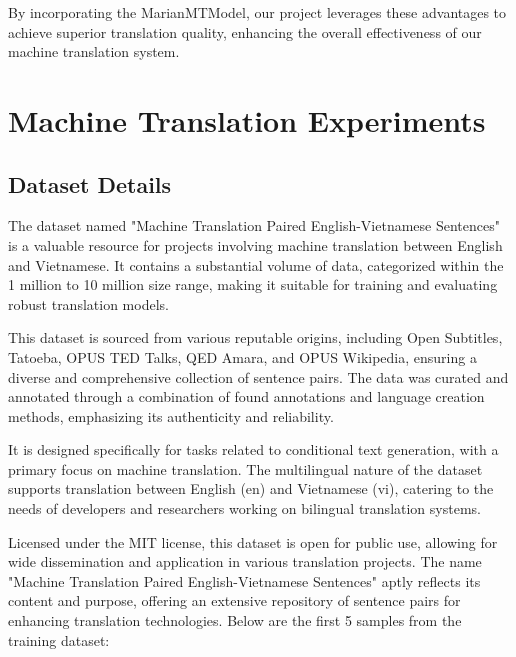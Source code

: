 \documentclass{article}
\begin{document}
By incorporating the MarianMTModel, our project leverages these advantages to achieve superior translation quality, enhancing the overall effectiveness of our machine translation system.

\section{Machine Translation Experiments}

\subsection{Dataset Details}
The dataset named "Machine Translation Paired English-Vietnamese Sentences" is a valuable resource for projects involving machine translation between English and Vietnamese. It contains a substantial volume of data, categorized within the 1 million to 10 million size range, making it suitable for training and evaluating robust translation models.

This dataset is sourced from various reputable origins, including Open Subtitles, Tatoeba, OPUS TED Talks, QED Amara, and OPUS Wikipedia, ensuring a diverse and comprehensive collection of sentence pairs. The data was curated and annotated through a combination of found annotations and language creation methods, emphasizing its authenticity and reliability.

It is designed specifically for tasks related to conditional text generation, with a primary focus on machine translation. The multilingual nature of the dataset supports translation between English (en) and Vietnamese (vi), catering to the needs of developers and researchers working on bilingual translation systems.

Licensed under the MIT license, this dataset is open for public use, allowing for wide dissemination and application in various translation projects. The name "Machine Translation Paired English-Vietnamese Sentences" aptly reflects its content and purpose, offering an extensive repository of sentence pairs for enhancing translation technologies.
Below are the first 5 samples from the training dataset:
\end{document}
